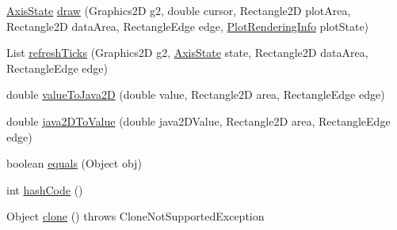 \begin{DoxyCompactItemize}
\item 
\mbox{\hyperlink{classorg_1_1jfree_1_1chart_1_1axis_1_1_axis_state}{Axis\+State}} \mbox{\hyperlink{classorg_1_1jfree_1_1chart_1_1axis_1_1_period_axis_af2ce1b30092e709bd3f2f2550bdd947b}{draw}} (Graphics2D g2, double cursor, Rectangle2D plot\+Area, Rectangle2D data\+Area, Rectangle\+Edge edge, \mbox{\hyperlink{classorg_1_1jfree_1_1chart_1_1plot_1_1_plot_rendering_info}{Plot\+Rendering\+Info}} plot\+State)
\item 
List \mbox{\hyperlink{classorg_1_1jfree_1_1chart_1_1axis_1_1_period_axis_aa2dc107de6e8dee12d7d3378ffe7534a}{refresh\+Ticks}} (Graphics2D g2, \mbox{\hyperlink{classorg_1_1jfree_1_1chart_1_1axis_1_1_axis_state}{Axis\+State}} state, Rectangle2D data\+Area, Rectangle\+Edge edge)
\item 
double \mbox{\hyperlink{classorg_1_1jfree_1_1chart_1_1axis_1_1_period_axis_a1b6dda0de71ba907eaee3d62bddadb7a}{value\+To\+Java2D}} (double value, Rectangle2D area, Rectangle\+Edge edge)
\item 
double \mbox{\hyperlink{classorg_1_1jfree_1_1chart_1_1axis_1_1_period_axis_a6be5f78e8214ef6338b3342c35cd2efb}{java2\+D\+To\+Value}} (double java2\+D\+Value, Rectangle2D area, Rectangle\+Edge edge)
\item 
boolean \mbox{\hyperlink{classorg_1_1jfree_1_1chart_1_1axis_1_1_period_axis_a1961d898c98df2bffdfcf59d54eec83a}{equals}} (Object obj)
\item 
int \mbox{\hyperlink{classorg_1_1jfree_1_1chart_1_1axis_1_1_period_axis_ab360ac06b40342bc1c31853ad32152dc}{hash\+Code}} ()
\item 
Object \mbox{\hyperlink{classorg_1_1jfree_1_1chart_1_1axis_1_1_period_axis_af843a666ad10aec183f776a0b82247d8}{clone}} ()  throws Clone\+Not\+Supported\+Exception 
\end{DoxyCompactItemize}
